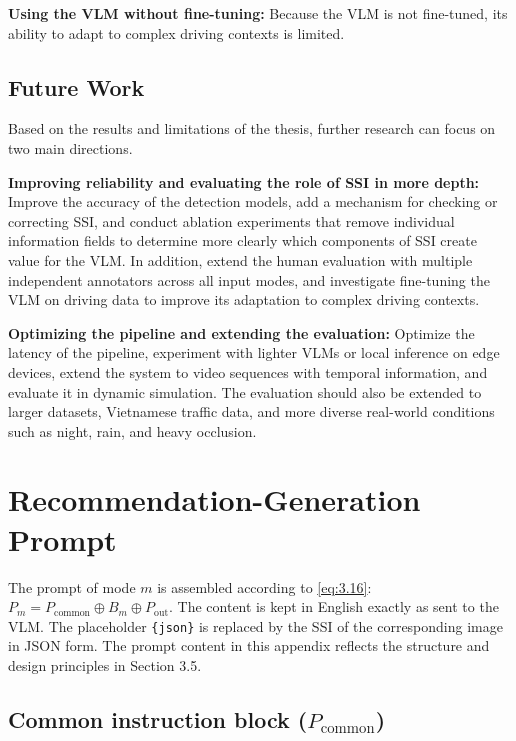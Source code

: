 \documentclass[12pt,a4paper]{report}
\begin{document}
\textbf{Using the VLM without fine-tuning:} Because the VLM is not fine-tuned, its ability to adapt to complex driving contexts is limited.

\section{Future Work}

Based on the results and limitations of the thesis, further research can focus on two main directions.

\textbf{Improving reliability and evaluating the role of SSI in more depth:} Improve the accuracy of the detection models, add a mechanism for checking or correcting SSI, and conduct ablation experiments that remove individual information fields to determine more clearly which components of SSI create value for the VLM. In addition, extend the human evaluation with multiple independent annotators across all input modes, and investigate fine-tuning the VLM on driving data to improve its adaptation to complex driving contexts.

\textbf{Optimizing the pipeline and extending the evaluation:} Optimize the latency of the pipeline, experiment with lighter VLMs or local inference on edge devices, extend the system to video sequences with temporal information, and evaluate it in dynamic simulation. The evaluation should also be extended to larger datasets, Vietnamese traffic data, and more diverse real-world conditions such as night, rain, and heavy occlusion.

\clearpage
{}
{}



\appendix

\chapter{Recommendation-Generation Prompt}
\label{app:prompt}

The prompt of mode $m$ is assembled according to \eqref{eq:3.16}: $P_m = P_{\mathrm{common}} \oplus B_m \oplus P_{\mathrm{out}}$. The content is kept in English exactly as sent to the VLM. The placeholder \verb|{json}| is replaced by the SSI of the corresponding image in JSON form. The prompt content in this appendix reflects the structure and design principles in Section 3.5.

\section{Common instruction block (\texorpdfstring{$P_{\mathrm{common}}$}{P_common})}
\end{document}
